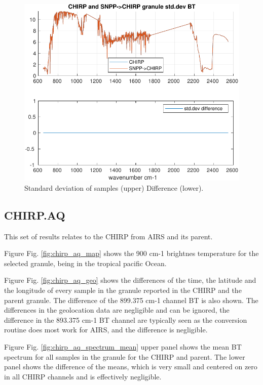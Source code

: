 \documentclass[11pt]{article}
\begin{document}
\begin{figure}[htbp]
\centering
\includegraphics[width=.9\linewidth]{./figs/2020d001g238_bt_spectrum_std.pdf}
\caption{\label{fig:org7eac56f}
Standard deviation of samples (upper) Difference (lower).}
\end{figure}



\subsection{CHIRP.AQ}
\label{sec:orgc1d1ae4}

This set of results relates to the CHIRP from AIRS and its parent.

Figure Fig. \ref{fig:chirp_aq_map} shows the 900 cm-1 brightnes temperature for the selected granule, being in the tropical pacific Ocean.

Figure Fig. \ref{fig:chirp_aq_geo} shows the differences of the time, the latitude and the longitude of every sample in the granule  reported in the CHIRP and the parent granule. The difference of the 899.375 cm-1 channel BT is also shown. The differences in the geolocation data are negligible and can be ignored, the difference in the 893.375 cm-1 BT channel are typically seen as the conversion routine does most work for AIRS, and the difference is negligible.

Figure Fig. \ref{fig:chirp_aq_spectrum_mean} upper panel shows the mean BT spectrum for all samples in the granule for the CHIRP and parent. The lower panel shows the difference of the means, which is very small and centered on zero in all CHIRP channels and is effectively negligible.
\end{document}
